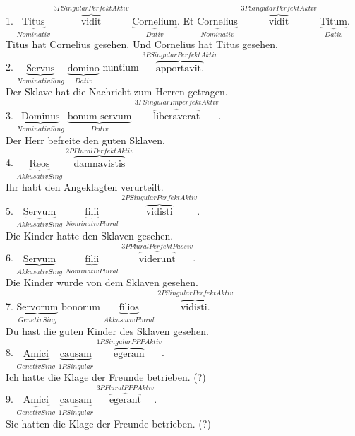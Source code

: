 \documentclass[a4paper]{article}
\newcommand{\ann}[2]{$\underbrace{\text{#1}}_{#2}$}
\newcommand{\ovv}[2]{$\overbrace{\text{#1}}^{#2}$}
\begin{document}
1. \ann{Titus}{Nominativ} \ovv{vidit}{3P Singular Perfekt Aktiv} \ann{Cornelium}{Dativ}. Et \ann{Cornelius}{Nominativ} \ovv{vidit}{3P Singular Perfekt Aktiv} \ann{Titum}{Dativ}.\\

Titus hat Cornelius gesehen. Und Cornelius hat Titus gesehen. \\

2. \ann{Servus}{Nominativ Sing} \ann{domino}{Dativ} nuntium \ovv{apportavit.}{3P Singular Perfekt Aktiv}  \\

Der Sklave hat die Nachricht zum Herren getragen. \\

3. \ann{Dominus}{Nominativ Sing} \ann{bonum servum}{Dativ} \ovv{liberaverat}{3P Singular Imperfekt Aktiv}. \\

Der Herr befreite den guten Sklaven. \\

4. \ann{Reos}{AkkusativSing } \ovv{damnavistis}{2P Plural Perfekt Aktiv} \\

Ihr habt den Angeklagten verurteilt. \\

5. \ann{Servum}{Akkusativ Sing} \ann{filii}{Nominativ Plural} \ovv{vidisti}{2P Singular Perfekt Aktiv}. \\

Die Kinder hatte den Sklaven gesehen. \\

6. \ann{Servum}{Akkusativ Sing} \ann{filii}{Nominativ Plural} \ovv{viderunt}{3P Plural Perfekt Passiv}. \\

Die Kinder wurde von dem Sklaven gesehen. \\

7. \ann{Servorum}{Genetiv Sing} bonorum \ann{filios}{Akkusativ Plural} \ovv{vidisti.}{2P Singular Perfekt Aktiv} \\

Du hast die guten Kinder des Sklaven gesehen. \\

8. \ann{Amici}{Genetiv Sing} \ann{causam}{1P Singular} \ovv{egeram}{1P Singular PPP Aktiv}. \\

Ich hatte die Klage der Freunde betrieben. (?) \\

9. \ann{Amici}{Genetiv Sing} \ann{causam}{1P Singular} \ovv{egerant}{3P Plural PPP Aktiv}. \\

Sie hatten die Klage der Freunde betrieben. (?) 
\end{document}
